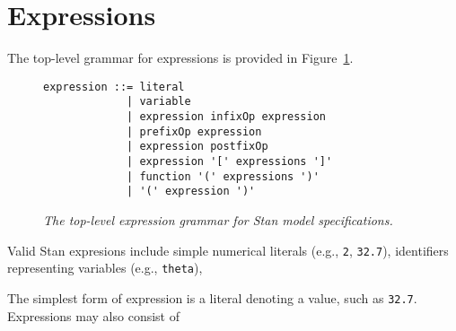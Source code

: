 \documentclass[11pt]{report}
\newcommand{\Stan}{Stan\xspace}
\newcommand{\code}[1]{{\tt #1}}
\newcommand{\mycaption}[2]{\caption{{\it #2}\label{#1.fig}}}
\newcommand{\reffig}[1]{Figure~\ref{#1.fig}}
\begin{document}
\section{Expressions}

The top-level grammar for expressions is provided in \reffig{expression-grammar}.

\begin{figure}
\begin{center}
\begin{verbatim}
expression ::= literal
             | variable
             | expression infixOp expression
             | prefixOp expression
             | expression postfixOp
             | expression '[' expressions ']'
             | function '(' expressions ')'
             | '(' expression ')'
\end{verbatim}
\end{center}
\mycaption{expression-grammar}
          {The top-level expression grammar for Stan model specifications.}
\end{figure}

Valid \Stan expresions include simple numerical literals (e.g.,
\code{2}, \code{32.7}), identifiers representing variables (e.g.,
\code{theta}), 

The simplest form of expression is a literal denoting a
value, such as \code{32.7}.  Expressions may also consist of
\end{document}
